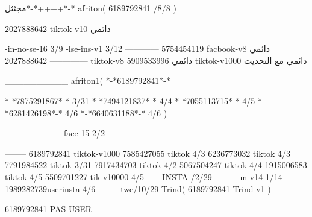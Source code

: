 مجثثل*-*++++*-*
afriton(
6189792841 /8/8
)

2027888642 tiktok-v10
دائمي

-in-no-se-16 3/9
-lse-ins-v1 3/12
------------
5754454119 facbook-v8
دائمي
--------------
2027888642 tiktok-v8
دائمي
5909533996 tiktok-v1000
دائمي مع التحديث

__________
afriton1(
*-*6189792841*-*

*-*7875291867*-* 3/31
*-*7494121837*-* 4/4
*-*7055113715*-* 4/5
*-*6281426198*-* 4/6
*-*6640631188*-* 4/6
)


------
------------
-face-15 2/2

--------
6189792841 tiktok-v1000
7585427055 tiktok 4/3
6236773032 tiktok 4/3
7791984522 tiktok 3/31
7917434703 tiktok 4/2
5067504247 tiktok 4/4
1915006583 tiktok 4/5
5509701227 tik-v10000 4/5
-----
 INSTA /2/29
-------
-m-v14 1/14
-----
1989282739userinsta 4/6
------
-twe/10/29
Trind(
6189792841-Trind-v1 
)

6189792841-PAS-USER
    ---------------
